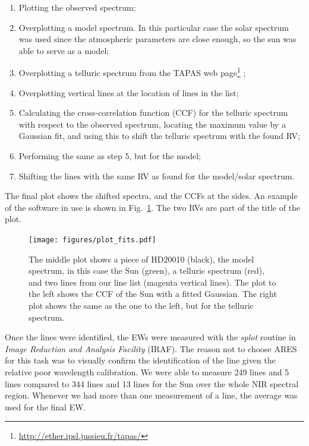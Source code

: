 \documentclass{aa}
\begin{document}
\begin{enumerate}
    \item Plotting the observed spectrum;
    \item Overplotting a model spectrum. In this particular case the solar spectrum was
        used since the atmospheric parameters are close enough, so the sun was able to
        serve as a model;
    \item Overplotting a telluric spectrum from the TAPAS web
          page\footnote{\url{http://ether.ipsl.jussieu.fr/tapas/}} \citep{Bertaux2014};
    \item Overplotting vertical lines at the location of lines in the list;
    \item Calculating the cross-correlation function (CCF) for the telluric spectrum
        with respect to the observed spectrum, locating the maximum value by a Gaussian fit,
        and using this to shift the telluric spectrum with the found RV;
    \item Performing the same as  step 5, but for the model;
    \item Shifting the lines with the same RV as found for the model/solar spectrum.
\end{enumerate}
The final plot shows the shifted spectra, and the CCFs at the sides. An
example of the software in use is shown in Fig.~\ref{fig:plot_fits}. The
two RVs are part of the title of the plot.

\begin{figure}[tbp!]
    \centering
    \texttt{[image: figures/plot\_fits.pdf]}
    \caption{The middle plot shows a piece of HD20010 (black), the model
    spectrum, in this case the Sun (green), a telluric spectrum (red),
    and two lines from our line list (magenta vertical lines). The
    plot to the left shows the CCF of the Sun with a fitted Gaussian.
    The right plot shows the same as the one to the left, but for the
    telluric spectrum.}
    \label{fig:plot_fits}
\end{figure}

Once the lines were identified, the EWs were measured with the
\emph{splot} routine in \emph{Image Reduction and Analysis Facility} (IRAF). The reason not to choose ARES for this
task was to visually confirm the identification of the line given the
relative poor wavelength calibration. We were able to measure 249
 lines and 5  lines compared to 344 
lines and 13  lines for the Sun over the whole NIR spectral
region. Whenever we had more than one measurement of a line, the average
was used for the final EW.
\end{document}
